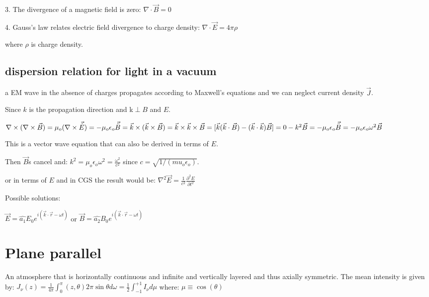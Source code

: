\documentclass[12pt]{report}
\begin{document}
3. The divergence of a magnetic field is zero: $\nabla \cdot \vec{B}=0$

4. Gauss's law relates electric field divergence to charge density: $\nabla \cdot \vec{E}=4\pi\rho$

where $\rho$ is charge density.

\subsection{dispersion relation for light in a vacuum}
a EM wave in the absence of charges propagates according to Maxwell's equations and we can neglect current density $\vec{J}$.

  Since $k$ is the propagation direction and k$ \perp B$ and $E$.
  
$\nabla \times(\nabla \times \vec{B})=\mu_o(\nabla \times \vec{\dot{E}})=-\mu_o\epsilon_o \vec{\ddot{B}}=\vec{k}\times(\vec{k} \times \vec{B}) \\
=\vec{k}\times\vec{k} \times \vec{B}=[\vec{k}(\vec{k} \cdot \vec{B}) - (\vec{k} \cdot \vec{k})\vec{B}]=0 -k^2\vec{B}=  -\mu_o\epsilon_o \vec{\ddot{B}}= -\mu_o\epsilon_o \omega^2 \vec{B} $

This is a vector wave equation that can also be derived in terms of $E$.


Then $\vec{B}$s cancel and: $k^2=\mu_o \epsilon_o \omega^2=\frac{\omega^2}{c^2}$ since $c=\sqrt{1/(mu_o \epsilon_o)}$.

or in terms of $E$ and in CGS the result would be: $\nabla^2\vec{E}=\frac{1}{c^2}\frac{\partial^2 E}{\partial t^2}$

Possible solutions:

$\vec{E}=\hat{a_1}E_0e^{i(\vec{k}\cdot\vec{r} -\omega t)}$ or $\vec{B}=\hat{a_2}B_0e^{i(\vec{k}\cdot\vec{r} -\omega t)}$



 \section{Plane parallel}
 
 An atmosphere that is horizontally continuous and infinite and vertically layered and thus axially symmetric. 
The mean intensity is given by: 
\( J_\nu(z)=\frac{1}{4\pi}\int_0^\pi(z,\theta)2\pi \sin\theta d\omega= \frac{1}{2}\int_{-1}^{+1}I_\nu d\mu\)
where:
$\mu \equiv \cos(\theta)$
\end{document}
